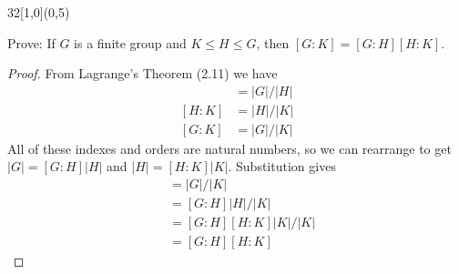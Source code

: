 \documentclass[12pt]{article}
\newenvironment{exercise}[2]{\begin{textblock}{32}[1,0](0,#2)\noindent#1\end{textblock}}{\vspace{1in}}
\begin{document}
\begin{exercise}{2.10}{5}
	{\noindent}Prove: If $G$ is a finite group and $K\le H\le G$, then $[G:K]=[G:H][H:K]$.
	\bigskip
	\begin{proof}
		From Lagrange's Theorem (2.11) we have
		\begin{align*}
			[G:H]&=|G|/|H|\\
			[H:K]&=|H|/|K|\\
			[G:K]&=|G|/|K|
		\end{align*}
		All of these indexes and orders are natural numbers, so we can rearrange to get $|G|=[G:H]|H|$ and $|H|=[H:K]|K|$. Substitution gives
		\begin{align*}
			[G:K]&=|G|/|K|\\
			&=[G:H]|H|/|K|\\
			&=[G:H][H:K]|K|/|K|\\
			&=[G:H][H:K]
		\end{align*}
	\end{proof}
\end{exercise}

%
%
\end{document}
